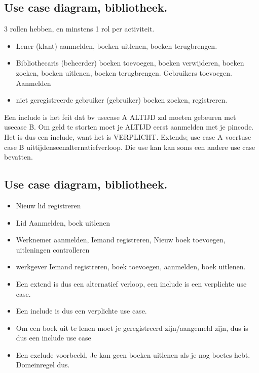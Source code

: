 \documentclass{article}
\begin{document}
\subsection{Use case diagram, bibliotheek.}
3 rollen hebben, en minstens 1 rol per activiteit.

\begin{itemize}
\item Lener (klant) 	aanmelden, boeken uitlenen, boeken terugbrengen.
\item Bibliothecaris (beheerder) boeken toevoegen, boeken verwijderen, boeken zoeken, boeken uitlenen, boeken terugbrengen. Gebruikers toevoegen. Aanmelden
\item niet geregistreerde gebruiker (gebruiker) boeken zoeken, registreren.
\end{itemize}
Een include is het feit dat bv usecase A ALTIJD zal moeten gebeuren met usecase B.
Om geld te storten moet je ALTIJD eerst aanmelden met je pincode. Het is dus een include, want het is VERPLICHT.
Extends; use case A voertuse case B uittijdenseenalternatiefverloop.  Die use kan kan soms een andere use case bevatten.

\subsection{Use case diagram, bibliotheek.}
\begin{itemize}
\item Nieuw lid 	registreren
\item Lid	Aanmelden, boek uitlenen
\item Werknemer	aanmelden, Iemand registreren, Nieuw boek toevoegen, uitleningen controlleren
\item werkgever	Iemand registreren, boek toevoegen, aanmelden, boek uitlenen.

\item Een extend is dus een alternatief verloop, een include is een verplichte use case.
\item Een include is dus een verplichte use case.


\item Om een boek uit te lenen moet je geregistreerd zijn/aangemeld zijn, dus is dus een include use case

\item Een exclude voorbeeld, Je kan geen boeken uitlenen als je nog boetes hebt. Domeinregel dus.
\end{itemize}
\end{document}
